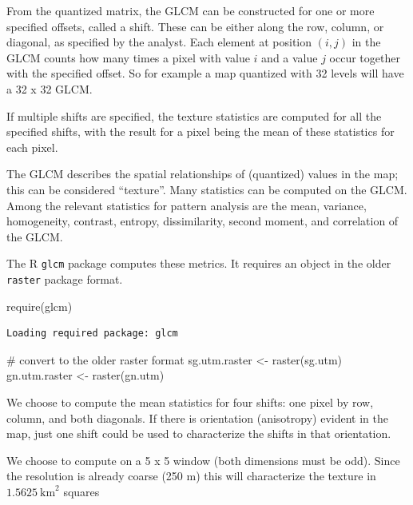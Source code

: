 \documentclass[
  letterpaper,
  DIV=11,
  numbers=noendperiod]{scrartcl}
\newenvironment{Shaded}{\begin{snugshade}}{\end{snugshade}}
\newcommand{\CommentTok}[1]{\textcolor[rgb]{0.37,0.37,0.37}{#1}}
\newcommand{\FunctionTok}[1]{\textcolor[rgb]{0.28,0.35,0.67}{#1}}
\newcommand{\NormalTok}[1]{\textcolor[rgb]{0.00,0.23,0.31}{#1}}
\newcommand{\OtherTok}[1]{\textcolor[rgb]{0.00,0.23,0.31}{#1}}
\begin{document}
From the quantized matrix, the GLCM can be constructed for one or more
specified offsets, called a shift. These can be either along the row,
column, or diagonal, as specified by the analyst. Each element at
position \((i,j)\) in the GLCM counts how many times a pixel with value
\(i\) and a value \(j\) occur together with the specified offset. So for
example a map quantized with 32 levels will have a 32 x 32 GLCM.

If multiple shifts are specified, the texture statistics are computed
for all the specified shifts, with the result for a pixel being the mean
of these statistics for each pixel.

The GLCM describes the spatial relationships of (quantized) values in
the map; this can be considered ``texture''. Many statistics can be
computed on the GLCM. Among the relevant statistics for pattern analysis
are the mean, variance, homogeneity, contrast, entropy, dissimilarity,
second moment, and correlation of the GLCM.

The R \texttt{glcm} package computes these metrics. It requires an
object in the older \texttt{raster} package format.

\begin{Shaded}
\begin{Highlighting}[]
\FunctionTok{require}\NormalTok{(glcm)}
\end{Highlighting}
\end{Shaded}

\begin{verbatim}
Loading required package: glcm
\end{verbatim}

\begin{Shaded}
\begin{Highlighting}[]
\CommentTok{\# convert to the older \textasciigrave{}raster\textasciigrave{} format}
\NormalTok{sg.utm.raster }\OtherTok{\textless{}{-}} \FunctionTok{raster}\NormalTok{(sg.utm)}
\NormalTok{gn.utm.raster }\OtherTok{\textless{}{-}} \FunctionTok{raster}\NormalTok{(gn.utm)}
\end{Highlighting}
\end{Shaded}

We choose to compute the mean statistics for four shifts: one pixel by
row, column, and both diagonals. If there is orientation (anisotropy)
evident in the map, just one shift could be used to characterize the
shifts in that orientation.

We choose to compute on a 5 x 5 window (both dimensions must be odd).
Since the resolution is already coarse (250 m) this will characterize
the texture in \(1.5625 ~ \mathrm{km}^2\) squares
\end{document}
